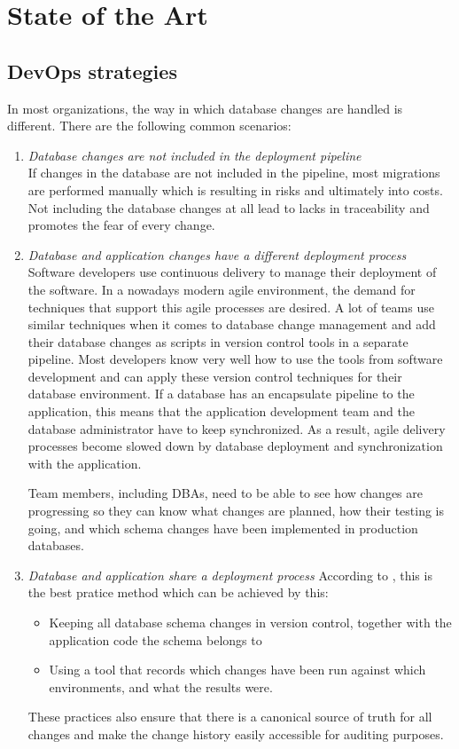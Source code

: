 \section{State of the Art}%
\subsection{DevOps strategies}
%
In most organizations, the way in which database changes are handled is different. There are the following common scenarios:

\begin{enumerate}
	\item \textit{Database changes are not included in the deployment pipeline}\\
	If changes in the database are not included in the pipeline, most migrations are performed manually which is resulting in risks and ultimately into costs. Not including the database changes at all lead to lacks in traceability and promotes the fear of every change.
	
	\item \textit{Database and application changes have a different deployment process}\\
	Software developers use continuous delivery to manage their deployment of the software. In a nowadays modern agile environment, the demand for techniques that support this agile processes are desired. A lot of teams use similar techniques when it comes to database change management and add their database changes as scripts in version control tools in a separate pipeline. Most developers know very well how to use the tools from software development and can apply these version control techniques for their database environment. If a database has an encapsulate pipeline to the application, this means that the application development team and the database administrator have to keep synchronized. As a result, agile delivery processes become slowed down by database deployment and synchronization with the application.
	
	Team members, including DBAs, need to be able to see how changes are progressing so they can know what changes are planned, how their testing is going, and which schema changes have been implemented in production databases.
	
	\item \textit{Database and application share a deployment process}
	According to  \cite{GoogleDevOps2022}, this is the best pratice method which can be achieved by this:
	\begin{itemize}
		\item Keeping all database schema changes in version control, together with the application code the schema belongs to
		\item Using a tool that records which changes have been run against which environments, and what the results were.
	\end{itemize}
	These practices also ensure that there is a canonical source of truth for all changes and make the change history easily accessible for auditing purposes.


\end{enumerate}
